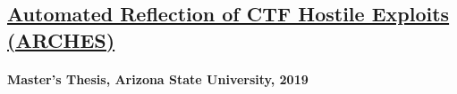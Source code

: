 \subsection{\href{https://keep.lib.asu.edu/items/157598}{Automated Reflection of CTF Hostile Exploits (ARCHES)}}
\paragraph{Master's Thesis, Arizona State University, 2019}
